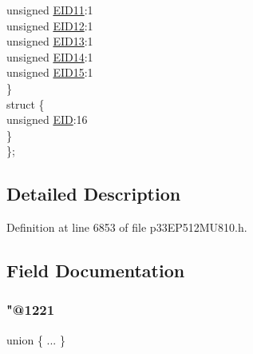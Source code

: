 \begin{DoxyCompactItemize}
\begin{tabbing}
\>\>unsigned \hyperlink{structtag_c2_r_x_f11_e_i_d_b_i_t_s_a710bdb0d602deb021b0be99066008018}{EID11}:1\\
\>\>unsigned \hyperlink{structtag_c2_r_x_f11_e_i_d_b_i_t_s_aa347bb85867bd8d4e0124f7cff8c6472}{EID12}:1\\
\>\>unsigned \hyperlink{structtag_c2_r_x_f11_e_i_d_b_i_t_s_a37d5f3edcbf6ef62f848fd4f3c584f79}{EID13}:1\\
\>\>unsigned \hyperlink{structtag_c2_r_x_f11_e_i_d_b_i_t_s_a7ffc0b0e0d99b8476b6f9a45337c17ab}{EID14}:1\\
\>\>unsigned \hyperlink{structtag_c2_r_x_f11_e_i_d_b_i_t_s_a293cd7dc1746257fa75a60cbd9383cd7}{EID15}:1\\
\>\} \\
\>struct \{\\
\>\>unsigned \hyperlink{structtag_c2_r_x_f11_e_i_d_b_i_t_s_ae80b378c9141f7c03e0b4e55b5f4b54d}{EID}:16\\
\>\} \\
\}; \\

\end{tabbing}\end{DoxyCompactItemize}


\subsection{Detailed Description}


Definition at line 6853 of file p33\+E\+P512\+M\+U810.\+h.



\subsection{Field Documentation}
\mbox{\label{structtag_c2_r_x_f11_e_i_d_b_i_t_s_a774a5a2b0402005c6031e61532a72302}} 
\subsubsection{\texorpdfstring{"@1221}{@1221}}
{\footnotesize\ttfamily union \{ ... \} }

\mbox{\label{structtag_c2_r_x_f11_e_i_d_b_i_t_s_ae80b378c9141f7c03e0b4e55b5f4b54d}} 
